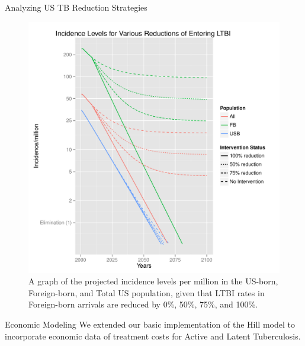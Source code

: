 \documentclass[final]{beamer}
\begin{document}
\begin{frame}
\begin{columns}
\begin{column}{.3\textwidth}
\begin{block}{Analyzing US TB Reduction Strategies}
\begin{figure}[h]
\begin{center}
            \includegraphics[scale=1]{incidencePlotRedEnLTBI.pdf}
          \end{center}
          \caption{A graph of the projected incidence levels per million in
                       the US-born, Foreign-born, and Total US population, given
                       that LTBI rates in Foreign-born arrivals are reduced by 
                       0\%, 50\%, 75\%, and 100\%.}
          \label{fig:redEnLTBI_incidence}
        \end{figure}
      \end{block}
      \begin{block}{Economic Modeling}
        We extended our basic implementation of the Hill model to incorporate
        economic data of treatment costs for Active and Latent Tuberculosis.  


\end{block}
\end{column}
\end{columns}
\end{frame}
\end{document}
